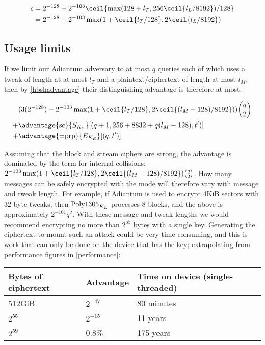 \documentclass[eprint.tex]{subfiles}
\begin{document}
\begin{align*}
\epsilon &= 2^{-128} + 2^{-103}\ceil{\max(128 + l_T, 256\ceil{l_L/8192})/128}  \\
&= 2^{-128} + 2^{-103}\max(1 + \ceil{l_T/128}, 2\ceil{l_L/8192})
\end{align*}\label{adiantumepsilon}

\subsection{Usage limits}
If we limit our Adiantum adversary to at most $q$ queries each of which uses a tweak of length at
at most $l_T$ and a plaintext/ciphertext of length at most $l_M$, then by \autoref{hbshadvantage}
their distinguishing advantage is therefore at most:

\begin{align*}
{}&( 3(2^{-128}) + 2^{-103}\max(1 + \ceil{l_T/128}, 2\ceil{(l_M - 128)/8192}))\binom{q}{2} \\
+{}& \advantage{\mathrm{sc}}{S_{K_S}}[(q + 1, 256 + 8832 + q(l_M - 128), t')] \\
+{}& \advantage{\pm \mathrm{prp}}{E_{K_E}}[(q, t')] \\
\end{align*}

Assuming that the block and stream ciphers are strong, the advantage is dominated by the
term for internal collisions: $2^{-103}\max(1 + \ceil{l_T/128}, 2\ceil{(l_M -
128)/8192})\binom{q}{2}$. How many messages can be safely encrypted with the
mode will therefore vary with message and tweak length. For example, if Adiantum
is used to encrypt 4KiB sectors with 32 byte tweaks, then $\operatorname{Poly1305}_{K_L}$
processes 8 blocks, and the above is approximately $2^{-101}q^2$. With these
message and tweak lengths we would recommend encrypting no more than $2^{55}$
bytes with a single key. Generating the ciphertext to mount such an attack could
be very time-consuming, and this is work that can only be done on the device
that has the key; extrapolating from performance figures in
\autoref{performance}:

\vspace{0.3cm}
\begin{tabular}{llll}
    Bytes of ciphertext & Advantage & Time on device (single-threaded) \\
    \hline
    512GiB & $2^{-47}$ & 80 minutes  \\
    $2^{55}$ & $2^{-15}$ & 11 years \\
    $2^{59}$ & 0.8\% & 175 years &
\end{tabular}
\vspace{0.3cm}

\subbib
\end{document}
